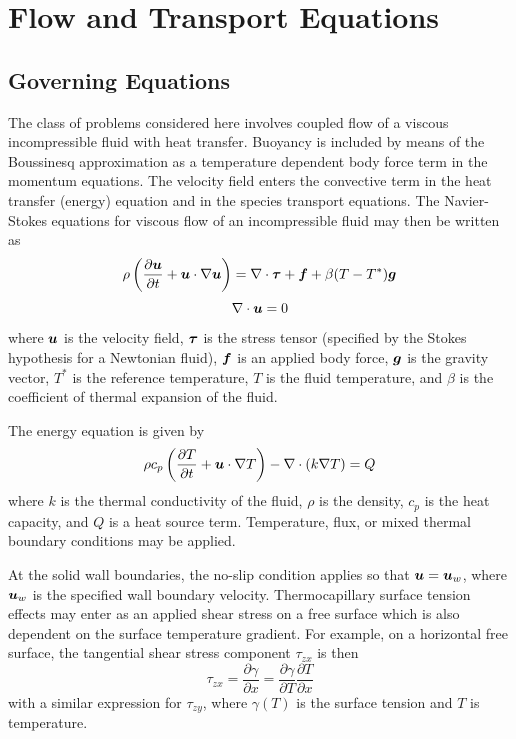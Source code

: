 \section{Flow and Transport Equations\label{governing_equations}}
\subsection{Governing Equations}
The class of problems considered here involves coupled flow of a viscous
incompressible fluid with heat transfer.
Buoyancy is included by means of the Boussinesq approximation as a
temperature dependent body force term in the momentum equations. The
velocity field enters the convective term in the heat transfer (energy)
equation and in the species transport equations. The Navier-Stokes
equations for viscous flow of an incompressible fluid may then be
written as
\begin{equation}
  \rho \left( {\frac{\partial \mbox{\boldmath $u$}}{\partial t} +
    \mbox{\boldmath $u$}\cdot \mathbf{\nabla} \mbox{\boldmath $u$} } \right) =
  \mathbf{\nabla}\cdot {\mbox{\boldmath $\tau$}} +
  \nonumber \mbox{\boldmath $f$} +
  \beta(T-T^{*})\mbox{\boldmath $g$}
  \label{momentum_eqn}
\end{equation}
\begin{equation}
  \mathbf{\nabla}\cdot \mbox{\boldmath $u$} = 0
  \label{continuity_eqn}
\end{equation}
\noindent
where $\mbox{\boldmath $u$}$ is the velocity field, $\mbox{\boldmath $\tau$}$ is the stress tensor
(specified by the Stokes hypothesis for a Newtonian fluid), ${\mbox{\boldmath $f$}}$ is
an applied body force, ${\mbox{\boldmath $g$}}$ is the gravity vector, $T^*$ is the
reference temperature, $T$ is the fluid temperature, and $\beta$ is the
coefficient of thermal expansion of the fluid.

The energy equation is given by
\begin{equation}
  \rho c_p \left(\frac{\partial T}{\partial t}+ { \mbox{\boldmath $u$}}\cdot
    {\mathbf{\nabla}} T \right) -
  {\mathbf{\nabla}} \cdot (k {\mathbf{\nabla} }T) = Q
  \label{thermal_eqn}
\end{equation}
\noindent
where $k$ is the thermal conductivity of the fluid, $\rho$ is the
density, $c_p$ is the heat capacity, and $Q$ is a heat source term.
Temperature, flux, or mixed thermal boundary conditions may be applied.

At the solid wall boundaries, the no-slip condition applies so that $\mbox{\boldmath $u$} = \mbox{\boldmath $u$}_w$, where $\mbox{\boldmath $u$}_w$ is the specified wall boundary velocity. Thermocapillary surface tension effects may enter as an applied shear
stress on a free surface which is also dependent on the surface temperature gradient. For
example, on a horizontal free surface, the tangential shear stress
component $\tau_{zx}$ is then
\begin{equation}
  \tau_{zx} = \frac{\partial \gamma}{\partial x} =
  \frac{\partial \gamma}{\partial T} \frac{\partial T}{\partial x}
  \label{tang_shear_eqn}
\end{equation}
\noindent
with a similar expression for $\tau_{zy}$, where $\gamma(T)$ is the
surface tension and $T$ is temperature.  



